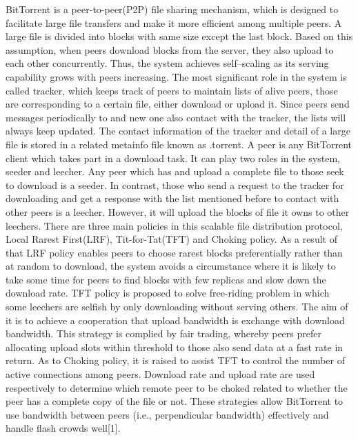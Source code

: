 \documentclass[conference]{IEEEtran}
\begin{document}
BitTorrent is a peer-to-peer(P2P) file sharing mechanism, which is designed to facilitate large file transfers and make it more efficient among multiple peers. A large file is divided into blocks with same size except the last block. Based on this assumption, when peers download blocks from the server, they also upload to each other concurrently. Thus, the system achieves self–scaling as its serving capability grows with peers increasing. 
The most significant role in the system is called tracker, which keeps track of peers to maintain lists of alive peers, those are corresponding to a certain file, either download or upload it. Since peers send messages periodically to and new one also contact with the tracker, the lists will always keep updated. The contact information of the tracker and detail of a large file is stored in a related metainfo file known as .torrent. A peer is any BitTorrent client which takes part in a download task. It can play two roles in the system, seeder and leecher. Any peer which has and upload a complete file to those seek to download is a seeder. In contrast, those who send a request to the tracker for downloading and get a response with the list mentioned before to contact with other peers is a leecher. However, it will upload the blocks of file it owns to other leechers.
There are three main policies in this scalable file distribution protocol, Local Rarest First(LRF), Tit-for-Tat(TFT) and Choking policy. As a result of that LRF policy enables peers to choose rarest blocks preferentially rather than at random to download, the system avoids a circumstance where it is likely to take some time for peers to find blocks with few replicas and slow down the download rate. TFT policy is proposed to solve free-riding problem in which some leechers are selfish by only downloading without serving others. The aim of it is to achieve a cooperation that upload bandwidth is exchange with download bandwidth. This strategy is complied by fair trading, whereby peers prefer allocating upload slots within threshold to those also send data at a fast rate in return. As to Choking policy, it is raised to assist TFT to control the number of active connections among peers. Download rate and upload rate are used respectively to determine which remote peer to be choked related to whether the peer has a complete copy of the file or not. These strategies allow BitTorrent to use bandwidth between peers (i.e., perpendicular bandwidth) effectively and handle flash crowds well[1].
\end{document}
